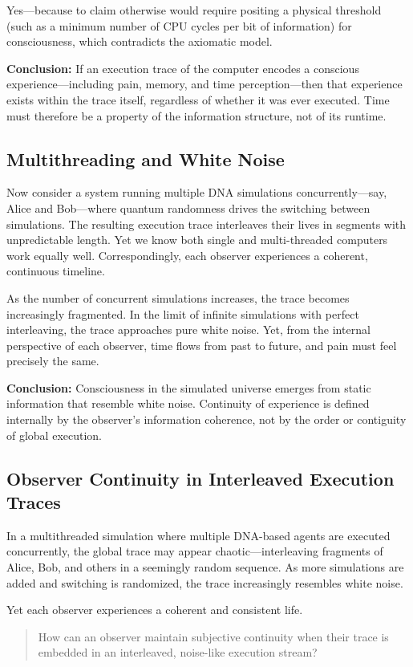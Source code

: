 \documentclass[11pt]{article}
\begin{document}
Yes—because to claim otherwise would require positing a physical threshold (such as a minimum number of CPU cycles per bit of information) for consciousness, which contradicts the axiomatic model.

\textbf{Conclusion:} If an execution trace of the computer encodes a conscious experience—including pain, memory, and time perception—then that experience exists within the trace itself,
regardless of whether it was ever executed. Time must therefore be a property of the information structure, not of its runtime.


\subsection{Multithreading and White Noise}

Now consider a system running multiple DNA simulations concurrently—say, Alice and Bob—where quantum randomness drives the switching between simulations.
The resulting execution trace interleaves their lives in  segments with unpredictable length. Yet we know both single and multi-threaded computers work equally well.
Correspondingly, each observer experiences a coherent, continuous timeline.

As the number of concurrent simulations increases, the trace becomes increasingly fragmented. In the limit of infinite simulations with perfect interleaving, the trace
approaches pure white noise. Yet, from the internal perspective of each observer, time flows from past to future, and pain must feel precisely the same.

\textbf{Conclusion:} Consciousness in the simulated universe emerges from static information that resemble white noise. Continuity of experience is defined internally by the observer’s information
coherence, not by the order or contiguity of global execution.


\subsection{Observer Continuity in Interleaved Execution Traces}

In a multithreaded simulation where multiple DNA-based agents are executed concurrently, the global trace may appear chaotic—interleaving fragments of Alice, Bob, and others in a seemingly random sequence. As more simulations are added and switching is randomized, the trace increasingly resembles white noise.

Yet each observer experiences a coherent and consistent life.
\begin{quote}
  How can an observer maintain subjective continuity when their trace is embedded in an interleaved, noise-like execution stream?
\end{quote}
\end{document}
